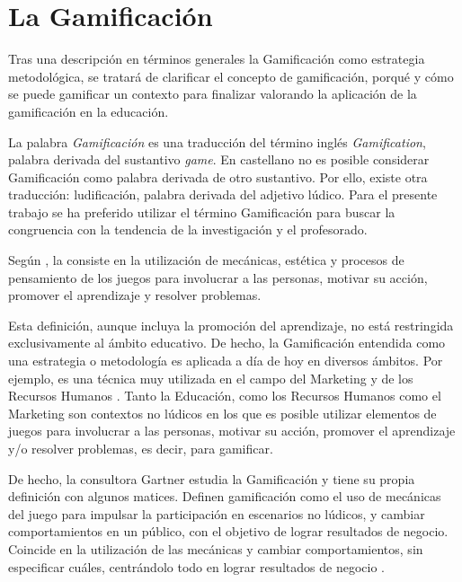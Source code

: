 
\chapter{La Gamificación}




Tras una descripción en términos generales la Gamificación como estrategia metodológica, se tratará de clarificar el concepto de gamificación, porqué y cómo se puede gamificar un contexto para finalizar valorando la aplicación de la gamificación en la educación.


La palabra \textit{Gamificación} es una traducción del término inglés \textit{Gamification}, palabra derivada del sustantivo \textit{game}.
%
En castellano no es posible considerar Gamificación como palabra derivada de otro sustantivo. Por ello, existe otra traducción: ludificación, palabra derivada del adjetivo lúdico.
%
Para el presente trabajo se ha preferido utilizar el término Gamificación para buscar la congruencia con la tendencia de la investigación y el profesorado.



Según  \cite{GamificationDef}, la  consiste en la utilización de mecánicas, estética y procesos de pensamiento de los juegos para involucrar a las personas, motivar su acción, promover el aprendizaje y resolver problemas.

Esta definición, aunque incluya la promoción del aprendizaje, no está restringida exclusivamente al ámbito educativo. 
%
De hecho, la Gamificación entendida como una estrategia o metodología es aplicada a día de hoy en diversos ámbitos. 
%
Por ejemplo, es una técnica muy utilizada en el campo del Marketing  \citep{GamifyMark} y de los Recursos Humanos  \citep{GamifyHR}.
%
Tanto la Educación, como los Recursos Humanos como el Marketing son contextos no lúdicos en los que es posible utilizar elementos de juegos para involucrar a las personas, motivar su acción, promover el aprendizaje y/o resolver problemas, es decir, para gamificar.

De hecho, la consultora Gartner estudia la Gamificación y tiene su propia definición con algunos matices.
%
Definen gamificación como el uso de mecánicas del juego para impulsar la participación en escenarios no lúdicos, y cambiar comportamientos en un público, con el objetivo de lograr resultados de negocio.
%
Coincide en la utilización de las mecánicas y cambiar comportamientos, sin especificar cuáles, centrándolo todo en lograr resultados de negocio \citep{Gartner}.

